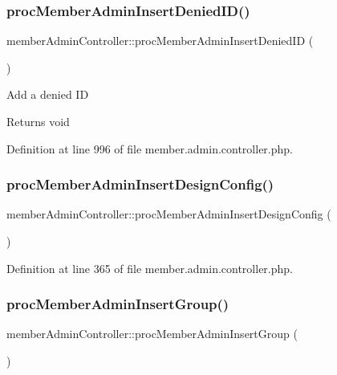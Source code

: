 \subsubsection{\texorpdfstring{proc\+Member\+Admin\+Insert\+Denied\+I\+D()}{procMemberAdminInsertDeniedID()}}
{\footnotesize\ttfamily member\+Admin\+Controller\+::proc\+Member\+Admin\+Insert\+Denied\+ID (\begin{DoxyParamCaption}{ }\end{DoxyParamCaption})}

Add a denied ID \begin{DoxyReturn}{Returns}
void 
\end{DoxyReturn}


Definition at line 996 of file member.\+admin.\+controller.\+php.

\mbox{\label{classmemberAdminController_a95ca46d0090220adba228592e8e09aa5}} 
\subsubsection{\texorpdfstring{proc\+Member\+Admin\+Insert\+Design\+Config()}{procMemberAdminInsertDesignConfig()}}
{\footnotesize\ttfamily member\+Admin\+Controller\+::proc\+Member\+Admin\+Insert\+Design\+Config (\begin{DoxyParamCaption}{ }\end{DoxyParamCaption})}



Definition at line 365 of file member.\+admin.\+controller.\+php.

\mbox{\label{classmemberAdminController_a3ae8c66d424cd909998fbcd9f257c809}} 
\subsubsection{\texorpdfstring{proc\+Member\+Admin\+Insert\+Group()}{procMemberAdminInsertGroup()}}
{\footnotesize\ttfamily member\+Admin\+Controller\+::proc\+Member\+Admin\+Insert\+Group (\begin{DoxyParamCaption}{ }\end{DoxyParamCaption})}

